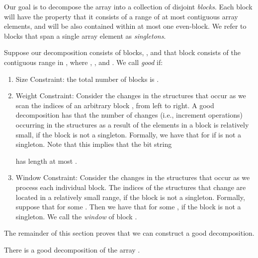 \documentclass[runningheads]{llncs}
\begin{document}
Our goal is to decompose the array into a collection of disjoint
\emph{blocks}.  Each block will have the property that it consists of
a range of at most  contiguous array elements, and will be also
contained within at most one even-block.  We refer to blocks that span
a single array element as \emph{singletons}.

Suppose our decomposition  consists of  blocks,
, and that block 
consists of the contiguous range  in , where , , and .  We call 
\emph{good} if:

\begin{enumerate}[label=\bfseries D\arabic*]

\item \label{en:size-const} Size Constraint: the total number of
  blocks is .

\item \label{en:weight-const} Weight Constraint: Consider the changes
  in the structures  that occur as we
  scan the indices of an arbitrary block , from left to
  right.  A good decomposition has that the number of changes (i.e.,
  increment operations) occurring in the structures as a result of the
  elements in a block is relatively small, if the block is not a
  singleton.  Formally, we have that  for  if  is not a
  singleton.  Note that this implies that the bit string
  
  has length at most .

\item \label{en:window-const} Window Constraint: Consider the changes
  in the structures that occur as we process each individual block.
  The indices of the structures that change are located in a
  relatively small range, if the block is not a singleton.  Formally,
  suppose that  for some .  Then we have that  for some ,
  if the block  is not a singleton.  We call
   the \emph{window} of block .

\end{enumerate}

The remainder of this section proves that we can construct a good
decomposition.

\begin{lemma}\label{lem:decomposition}
There is a good decomposition  of the array .
\end{lemma}
\end{document}
